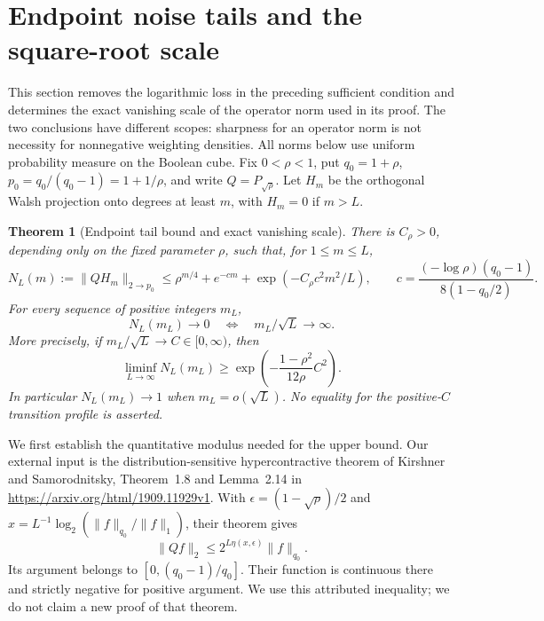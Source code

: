 \documentclass[11pt]{article}
\newtheorem{theorem}{Theorem}
\begin{document}
\section{Endpoint noise tails and the square-root scale}
\label{sec:square-root-tail}
This section removes the logarithmic loss in the preceding sufficient
condition and determines the exact vanishing scale of the operator norm
used in its proof. The two conclusions have different scopes: sharpness
for an operator norm is not necessity for nonnegative weighting densities.
All norms below use uniform probability measure on the Boolean cube.
Fix $0<\rho<1$, put $q_0=1+\rho$, $p_0=q_0/(q_0-1)=1+1/\rho$,
and write $Q=P_{\sqrt\rho}$. Let $H_m$ be the orthogonal Walsh projection
onto degrees at least $m$, with $H_m=0$ if $m>L$.

\begin{theorem}[Endpoint tail bound and exact vanishing scale]
\label{thm:square-root-tail}
There is $C_\rho>0$, depending only on the fixed parameter $\rho$, such that,
for $1\leq m\leq L$,
\begin{equation}\label{eq:327-tail-upper}
 N_L(m):=\|QH_m\|_{2\to p_0}
 \leq \rho^{m/4}+e^{-cm}+\exp(-C_\rho c^2m^2/L),
 \qquad c=\frac{(-\log\rho)(q_0-1)}{8(1-q_0/2)}.
\end{equation}
For every sequence of positive integers $m_L$,
\[
 N_L(m_L)\longrightarrow0
 \quad\Longleftrightarrow\quad m_L/\sqrt L\longrightarrow\infty.
\]
More precisely, if $m_L/\sqrt L\to C\in[0,\infty)$, then
\begin{equation}\label{eq:327-tail-lower}
 \liminf_{L\to\infty}N_L(m_L)
 \geq \exp\!\left(-\frac{1-\rho^2}{12\rho}C^2\right).
\end{equation}
In particular $N_L(m_L)\to1$ when $m_L=o(\sqrt L)$.
No equality for the positive-$C$ transition profile is asserted.
\end{theorem}

We first establish the quantitative modulus needed for the upper bound.
Our external input is the distribution-sensitive hypercontractive theorem
of Kirshner and Samorodnitsky, Theorem~1.8 and Lemma~2.14 in
\url{https://arxiv.org/html/1909.11929v1}. With
$\epsilon=(1-\sqrt\rho)/2$ and
$x=L^{-1}\log_2(\|f\|_{q_0}/\|f\|_1)$, their theorem gives
\begin{equation}\label{eq:327-KS}
 \|Qf\|_2\leq 2^{L\eta(x,\epsilon)}\|f\|_{q_0}.
\end{equation}
Its argument belongs to $[0,(q_0-1)/q_0]$. Their function is continuous
there and strictly negative for positive argument. We use this attributed
inequality; we do not claim a new proof of that theorem.
\end{document}
